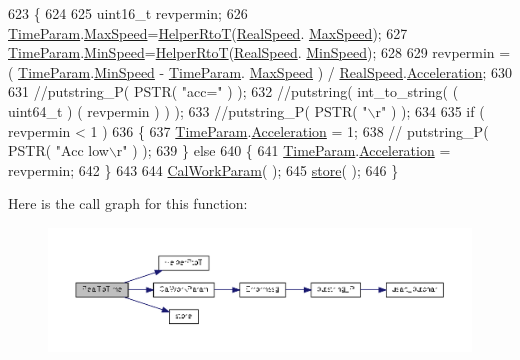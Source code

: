 \begin{DoxyCode}
623 \{
624     
625     uint16\_t revpermin;
626     \hyperlink{drv__8825_8c_a7d20b8cec6f96108790d4bf76b9c469d}{TimeParam}.\hyperlink{structMotor__Parameters_a501458e333945f49f03c295e2f49e3b9}{MaxSpeed}=\hyperlink{group__biba__drv_ga8f3808b2e4aa3b2a8f6467a2aaa31995}{HelperRtoT}(\hyperlink{drv__8825_8c_a2e720ed1ed0ef90dba27c1f246048dcd}{RealSpeed}.
      \hyperlink{structMotor__Parameters_a501458e333945f49f03c295e2f49e3b9}{MaxSpeed});
627     \hyperlink{drv__8825_8c_a7d20b8cec6f96108790d4bf76b9c469d}{TimeParam}.\hyperlink{structMotor__Parameters_aaf0ac3ed818f5c89cc86ea1d9174dc43}{MinSpeed}=\hyperlink{group__biba__drv_ga8f3808b2e4aa3b2a8f6467a2aaa31995}{HelperRtoT}(\hyperlink{drv__8825_8c_a2e720ed1ed0ef90dba27c1f246048dcd}{RealSpeed}.
      \hyperlink{structMotor__Parameters_aaf0ac3ed818f5c89cc86ea1d9174dc43}{MinSpeed});
628     
629     revpermin = ( \hyperlink{drv__8825_8c_a7d20b8cec6f96108790d4bf76b9c469d}{TimeParam}.\hyperlink{structMotor__Parameters_aaf0ac3ed818f5c89cc86ea1d9174dc43}{MinSpeed} - \hyperlink{drv__8825_8c_a7d20b8cec6f96108790d4bf76b9c469d}{TimeParam}.
      \hyperlink{structMotor__Parameters_a501458e333945f49f03c295e2f49e3b9}{MaxSpeed} ) / \hyperlink{drv__8825_8c_a2e720ed1ed0ef90dba27c1f246048dcd}{RealSpeed}.\hyperlink{structMotor__Parameters_aa9f1146edc6d945d535eec80a01481f1}{Acceleration};
630 
631     \textcolor{comment}{//putstring\_P( PSTR( "acc=" ) );}
632     \textcolor{comment}{//putstring( int\_to\_string( ( uint64\_t ) ( revpermin ) ) );}
633     \textcolor{comment}{//putstring\_P( PSTR( "\(\backslash\)r" ) );}
634 
635     if ( revpermin < 1 )
636     \{
637         \hyperlink{drv__8825_8c_a7d20b8cec6f96108790d4bf76b9c469d}{TimeParam}.\hyperlink{structMotor__Parameters_aa9f1146edc6d945d535eec80a01481f1}{Acceleration} = 1;
638         \textcolor{comment}{//  putstring\_P( PSTR( "Acc  low\(\backslash\)r" ) );}
639     \} \textcolor{keywordflow}{else}
640     \{
641         \hyperlink{drv__8825_8c_a7d20b8cec6f96108790d4bf76b9c469d}{TimeParam}.\hyperlink{structMotor__Parameters_aa9f1146edc6d945d535eec80a01481f1}{Acceleration} = revpermin;
642     \}
643 
644     \hyperlink{group__biba__drv_ga3389079a7106f1e741c0bc447dfbcbca}{CalWorkParam}( );
645     \hyperlink{group__biba__drv_gaaefaac2ed4c54f2008d8d236392c7261}{store}( );
646 \}
\end{DoxyCode}


Here is the call graph for this function\-:
\nopagebreak
\begin{figure}[H]
\begin{center}
\leavevmode
\includegraphics[width=350pt]{group__biba__drv_gad23127bea36c997c0b1c767f2421db6a_cgraph}
\end{center}
\end{figure}




